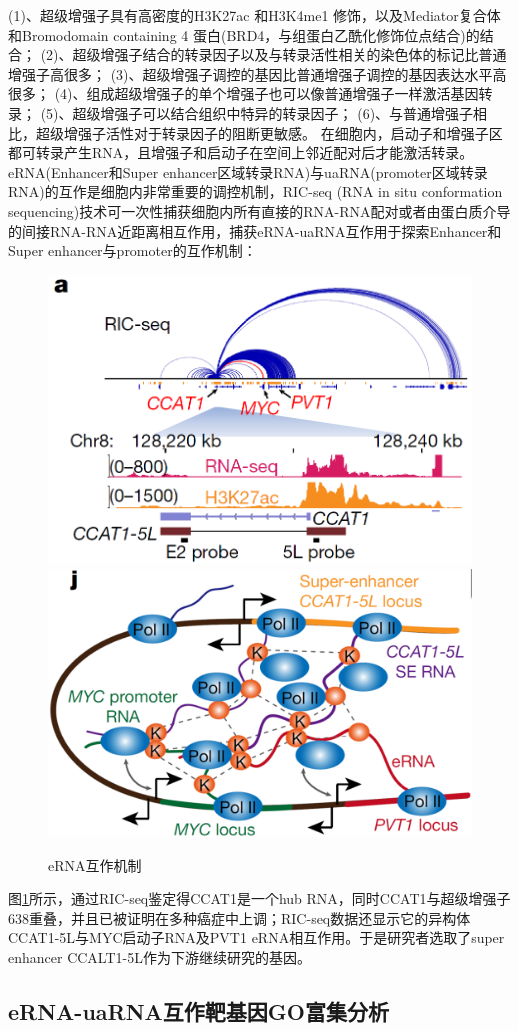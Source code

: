 \documentclass[
]{ctexart}
\begin{document}
(1)、超级增强子具有高密度的H3K27ac 和H3K4me1 修饰，以及Mediator复合体和Bromodomain containing 4 蛋白(BRD4，与组蛋白乙酰化修饰位点结合)的结合；
(2)、超级增强子结合的转录因子以及与转录活性相关的染色体的标记比普通增强子高很多；
(3)、超级增强子调控的基因比普通增强子调控的基因表达水平高很多；
(4)、组成超级增强子的单个增强子也可以像普通增强子一样激活基因转录；
(5)、超级增强子可以结合组织中特异的转录因子；
(6)、与普通增强子相比，超级增强子活性对于转录因子的阻断更敏感。
在细胞内，启动子和增强子区都可转录产生RNA，且增强子和启动子在空间上邻近配对后才能激活转录。eRNA(Enhancer和Super enhancer区域转录RNA)与uaRNA(promoter区域转录RNA)的互作是细胞内非常重要的调控机制，RIC-seq (RNA in situ conformation sequencing)技术可一次性捕获细胞内所有直接的RNA-RNA配对或者由蛋白质介导的间接RNA-RNA近距离相互作用，捕获eRNA-uaRNA互作用于探索Enhancer和Super enhancer与promoter的互作机制：

\begin{figure}[H]

{\centering \includegraphics[width=0.48\linewidth]{./1.picture/eRNA1} \includegraphics[width=0.48\linewidth]{./1.picture/eRNA2} 

}

\caption{eRNA互作机制}\label{fig:eRNA}
\end{figure}

图\ref{fig:eRNA}所示，通过RIC-seq鉴定得CCAT1是一个hub RNA，同时CCAT1与超级增强子638重叠，并且已被证明在多种癌症中上调；RIC-seq数据还显示它的异构体CCAT1-5L与MYC启动子RNA及PVT1 eRNA相互作用。于是研究者选取了super enhancer CCALT1-5L作为下游继续研究的基因。

\hypertarget{erna-uarnaux4e92ux4f5cux9776ux57faux56e0goux5bccux96c6ux5206ux6790}{%
\subsection{eRNA-uaRNA互作靶基因GO富集分析}\label{erna-uarnaux4e92ux4f5cux9776ux57faux56e0goux5bccux96c6ux5206ux6790}}
\end{document}

